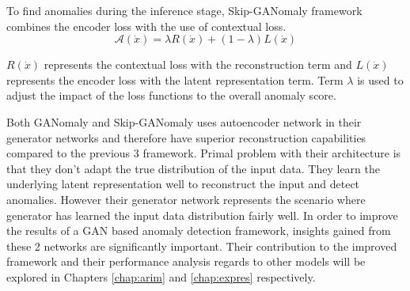 {To find anomalies during the inference stage, Skip-GANomaly framework combines the encoder loss with
the use of contextual loss. 
\begin{equation}
	\label{eqn:sganomaly_as}
    \mathcal{A}(\dot{x})=\lambda R(\dot{x})+(1-\lambda) L(\dot{x})  
\end{equation}

$R(\dot{x})$ represents the contextual loss with the reconstruction term and $L(\dot{x})$ represents
the encoder loss with the latent representation term. Term $\lambda$ is used to adjust the impact of
the loss functions to the overall anomaly score.

Both GANomaly and Skip-GANomaly uses autoencoder network in their generator networks
and therefore have superior reconstruction capabilities compared to the previous 3 framework.
Primal problem with their architecture is that they don't adapt the true distribution of the input
data. They learn the underlying latent representation well to reconstruct the input and detect
anomalies. However their generator network represents the scenario where generator has learned the
input data distribution fairly well. In order to improve the results of a GAN based anomaly
detection framework, insights gained from these 2 networks are significantly important. Their
contribution to the improved framework and their performance analysis regards to other models will
be explored in Chapters \ref{chap:arim} and \ref{chap:expres} respectively. 

} %
\endgroup
